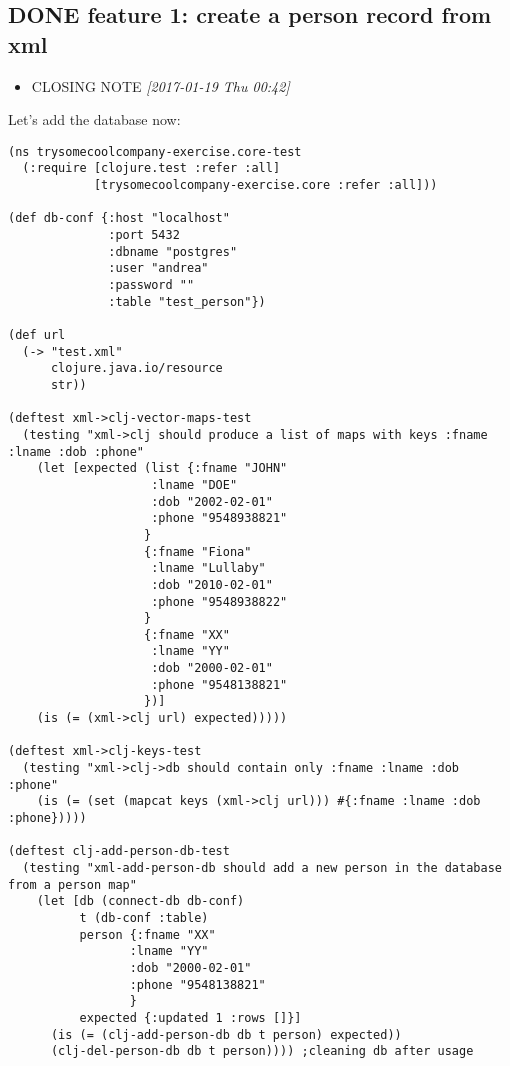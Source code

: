 \documentclass[11pt]{article}
\begin{document}
\subsection{{\bfseries\sffamily DONE} feature 1: create a person record from xml}
\label{sec:org13dd136}
\begin{itemize}
\item CLOSING NOTE \textit{[2017-01-19 Thu 00:42]}
\end{itemize}
Let's add the database now:
\begin{verbatim}
(ns trysomecoolcompany-exercise.core-test
  (:require [clojure.test :refer :all]
            [trysomecoolcompany-exercise.core :refer :all]))

(def db-conf {:host "localhost" 
              :port 5432 
              :dbname "postgres" 
              :user "andrea" 
              :password "" 
              :table "test_person"})

(def url 
  (-> "test.xml"
      clojure.java.io/resource
      str))

(deftest xml->clj-vector-maps-test
  (testing "xml->clj should produce a list of maps with keys :fname :lname :dob :phone"
    (let [expected (list {:fname "JOHN" 
                    :lname "DOE" 
                    :dob "2002-02-01"
                    :phone "9548938821"
                   } 
                   {:fname "Fiona"
                    :lname "Lullaby"
                    :dob "2010-02-01"
                    :phone "9548938822"
                   }
                   {:fname "XX"
                    :lname "YY"
                    :dob "2000-02-01"
                    :phone "9548138821"
                   })]
    (is (= (xml->clj url) expected)))))

(deftest xml->clj-keys-test
  (testing "xml->clj->db should contain only :fname :lname :dob :phone"
    (is (= (set (mapcat keys (xml->clj url))) #{:fname :lname :dob :phone}))))

(deftest clj-add-person-db-test
  (testing "xml-add-person-db should add a new person in the database from a person map"
    (let [db (connect-db db-conf)
          t (db-conf :table)
          person {:fname "XX"
                 :lname "YY"
                 :dob "2000-02-01"
                 :phone "9548138821"
                 }
          expected {:updated 1 :rows []}]
      (is (= (clj-add-person-db db t person) expected))
      (clj-del-person-db db t person)))) ;cleaning db after usage

\end{verbatim}
\end{document}
